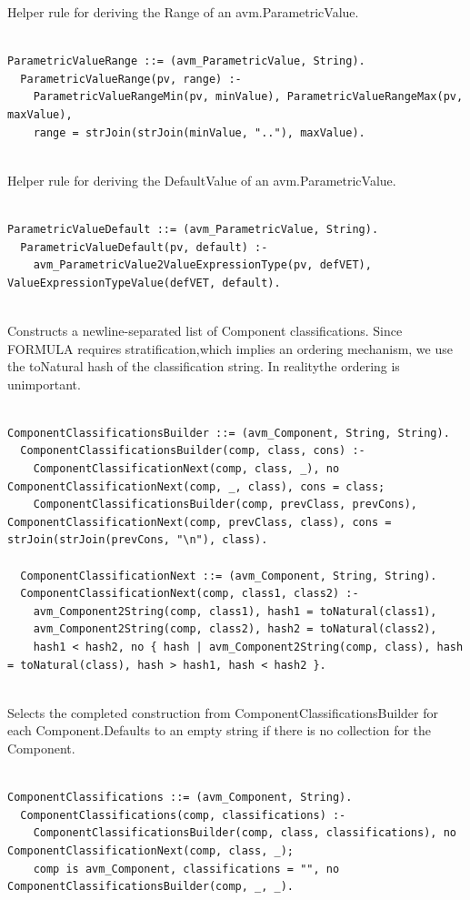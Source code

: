 Helper rule for deriving the Range of an avm.ParametricValue.
\begin{lstlisting}

ParametricValueRange ::= (avm_ParametricValue, String).
  ParametricValueRange(pv, range) :-
    ParametricValueRangeMin(pv, minValue), ParametricValueRangeMax(pv, maxValue),
    range = strJoin(strJoin(minValue, ".."), maxValue).


\end{lstlisting}

Helper rule for deriving the DefaultValue of an avm.ParametricValue.
\begin{lstlisting}

ParametricValueDefault ::= (avm_ParametricValue, String).
  ParametricValueDefault(pv, default) :-
    avm_ParametricValue2ValueExpressionType(pv, defVET), ValueExpressionTypeValue(defVET, default).


\end{lstlisting}

Constructs a newline-separated list of Component classifications. Since FORMULA requires stratification,which implies an ordering mechanism, we use the toNatural hash of the classification string. In realitythe ordering is unimportant.
\begin{lstlisting}

ComponentClassificationsBuilder ::= (avm_Component, String, String).
  ComponentClassificationsBuilder(comp, class, cons) :-
    ComponentClassificationNext(comp, class, _), no ComponentClassificationNext(comp, _, class), cons = class;
    ComponentClassificationsBuilder(comp, prevClass, prevCons), ComponentClassificationNext(comp, prevClass, class), cons = strJoin(strJoin(prevCons, "\n"), class).

  ComponentClassificationNext ::= (avm_Component, String, String).
  ComponentClassificationNext(comp, class1, class2) :-
    avm_Component2String(comp, class1), hash1 = toNatural(class1),
    avm_Component2String(comp, class2), hash2 = toNatural(class2),
    hash1 < hash2, no { hash | avm_Component2String(comp, class), hash = toNatural(class), hash > hash1, hash < hash2 }.


\end{lstlisting}

Selects the completed construction from ComponentClassificationsBuilder for each Component.Defaults to an empty string if there is no collection for the Component.
\begin{lstlisting}

ComponentClassifications ::= (avm_Component, String).
  ComponentClassifications(comp, classifications) :-
    ComponentClassificationsBuilder(comp, class, classifications), no ComponentClassificationNext(comp, class, _);
    comp is avm_Component, classifications = "", no ComponentClassificationsBuilder(comp, _, _).

\end{lstlisting}

